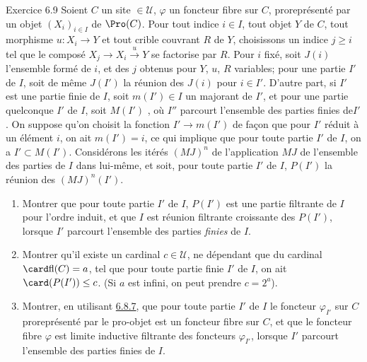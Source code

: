 \documentclass[10pt]{../fichiers-configuration-latex/smfart}
\begin{document}
\begin{enonce*}[remark]{Exercice 6.9}
Soient $C$ un site $\in 𝒰$, $\varphi$ un foncteur fibre sur
$C$, proreprésenté par un objet $(X_i)_{i\in I}$ de $\Pro(C)$. Pour
tout indice $i\in I$, tout objet $Y$ de $C$, tout morphisme
$u:X_i\rightarrow Y$ et tout crible couvrant $R$ de $Y$, choisissons
un indice $j\geq i$ tel que le composé $X_j\rightarrow
X_i\xrightarrow{u}Y$ se factorise par $R$. Pour $i$ fixé, soit
$J(i)$ l'ensemble formé de $i$, et des $j$ obtenus pour $Y$, $u$,
$R$ variables; pour une partie $I'$ de $I$, soit de même $J(I')$ la
réunion des $J(i)$ pour $i\in I'$. D'autre part, si $I'$ est une
partie finie de $I$, soit $m(I')\in I$ un majorant de $I'$, et pour
une partie quelconque $I'$ de $I$, soit $M(I')$
, où $I''$ parcourt
l'ensemble des parties finies
de\pageoriginale $I'$. On suppose qu'on choisit la fonction
$I'\rightarrow m(I')$ de façon que pour $I'$ réduit à un élément
$i$, on ait $m(I')=i$, ce qui implique que pour toute partie $I'$ de
$I$, on a $I'\subset M(I')$. Considérons les itérés $(MJ)^n$ de
l'application $MJ$ de l'ensemble des parties de $I$ dans lui-même,
et soit, pour toute partie $I'$ de $I$, $P(I')$ la réunion des
$(MJ)^n(I')$.
\begin{enumerate}
\renewcommand{\theenumi}{\alph{enumi}}
\renewcommand{\labelenumi}{\theenumi)}
\item Montrer que pour toute partie $I'$ de $I$, $P(I')$ est une
partie filtrante de $I$ pour l'ordre induit, et que $I$ est réunion
filtrante croissante des $P(I')$, lorsque $I'$ parcourt l'ensemble
des parties \emph{finies} de $I$.

\item Montrer qu'il existe un cardinal $c\in 𝒰$, ne dépendant
que du cardinal $\card \text{fl}(C)=a$, tel que pour toute partie
finie $I'$ de $I$, on ait $\card(P(I'))\leq c$. (Si $a$ est infini,
on peut prendre $c=2^{a}$).

\item Montrer, en utilisant \hyperref[IV.subsubsec6.8.7]{6.8.7}, que pour toute partie $I'$ de $I$
le foncteur $\varphi_{I'}$ sur $C$ proreprésenté par le pro-objet
 est un foncteur fibre sur $C$, et que le foncteur
fibre $\varphi$ est limite inductive filtrante des foncteurs
$\varphi_{I'}$, lorsque $I'$ parcourt l'ensemble des parties finies
de $I$.


\end{enumerate}
\end{enonce*}
\end{document}
